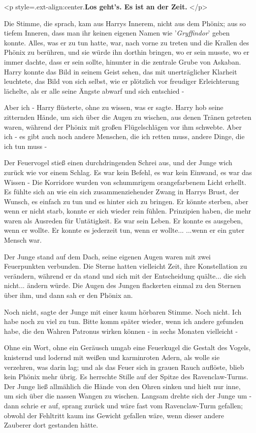 <p style=\grqq{}.ext-align:center\grqq{}.\textbf{Los geht's. Es ist an der Zeit.
}</p>

Die Stimme, die sprach, kam aus Harrys Innerem, nicht aus dem Phönix; aus so
tiefem Inneren, dass man ihr keinen eigenen Namen wie '\emph{Gryffindor}' geben
konnte. Alles, was er zu tun hatte, war, nach vorne zu treten und die Krallen
des Phönix zu berühren, und sie würde ihn dorthin bringen, wo er sein musste, wo
er immer dachte, dass er sein sollte, hinunter in die zentrale Grube von
Askaban. Harry konnte das Bild in seinem Geist sehen, das mit unerträglicher
Klarheit leuchtete, das Bild von sich selbst, wie er plötzlich vor freudiger
Erleichterung lächelte, als er alle seine Ängste abwarf und sich entschied -

\glqq Aber ich -\grqq{} Harry flüsterte, ohne zu wissen, was er sagte. Harry hob
seine zitternden Hände, um sich über die Augen zu wischen, aus denen Tränen
getreten waren, während der Phönix mit großen Flügelschlägen vor ihm schwebte.
\glqq Aber ich - es gibt auch noch andere Menschen, die ich retten muss, andere
Dinge, die ich tun muss -\grqq{}

Der Feuervogel stieß einen durchdringenden Schrei aus, und der Junge wich zurück
wie vor einem Schlag. Es war kein Befehl, es war kein Einwand, es war das Wissen
- Die Korridore wurden von schummrigem orangefarbenem Licht erhellt. Es fühlte
sich an wie ein sich zusammenziehender Zwang in Harrys Brust, der Wunsch, es
einfach zu tun und es hinter sich zu bringen. Er könnte sterben, aber wenn er
nicht starb, konnte er sich wieder rein fühlen. Prinzipien haben, die mehr waren
als Ausreden für Untätigkeit. Es war sein Leben. Er konnte es ausgeben, wenn er
wollte. Er konnte es jederzeit tun, wenn er wollte... ...wenn er ein guter
Mensch war.

Der Junge stand auf dem Dach, seine eigenen Augen waren mit zwei Feuerpunkten
verbunden. Die Sterne hatten vielleicht Zeit, ihre Konstellation zu verändern,
während er da stand und sich mit der Entscheidung quälte... die sich nicht...
ändern würde. Die Augen des Jungen flackerten einmal zu den Sternen über ihm,
und dann sah er den Phönix an.

\glqq Noch nicht\grqq{}, sagte der Junge mit einer kaum hörbaren Stimme. \glqq
Noch nicht. Ich habe noch zu viel zu tun. Bitte komm später wieder, wenn ich
andere gefunden habe, die den Wahren Patronus wirken können - in sechs Monaten
vielleicht -\grqq{}

Ohne ein Wort, ohne ein Geräusch umgab eine Feuerkugel die Gestalt des Vogels,
knisternd und lodernd mit weißen und karminroten Adern, als wolle sie verzehren,
was darin lag; und als das Feuer sich in grauen Rauch auflöste, blieb kein
Phönix mehr übrig. Es herrschte Stille auf der Spitze des Ravenclaw-Turms. Der
Junge ließ allmählich die Hände von den Ohren sinken und hielt nur inne, um sich
über die nassen Wangen zu wischen. Langsam drehte sich der Junge um - dann
schrie er auf, sprang zurück und wäre fast vom Ravenclaw-Turm gefallen; obwohl
der Fehltritt kaum ins Gewicht gefallen wäre, wenn dieser andere Zauberer dort
gestanden hätte.


